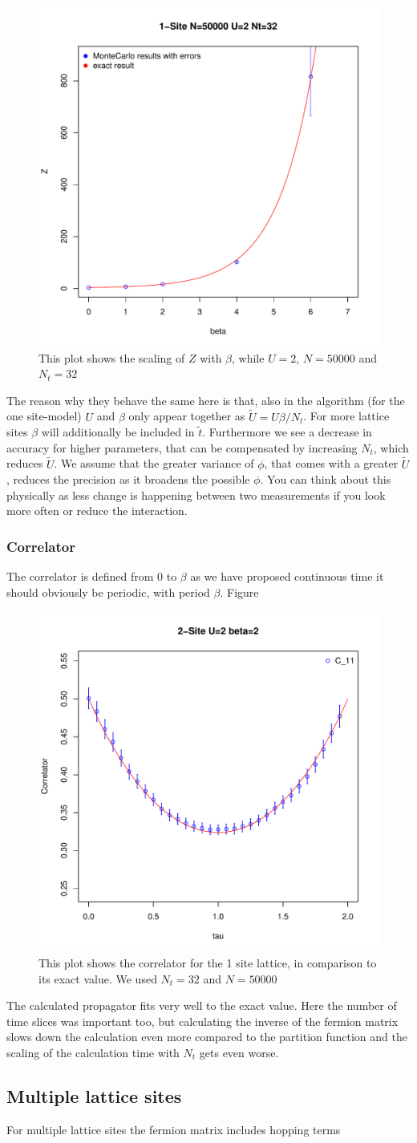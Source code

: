 \begin{figure}[H]
	\centering
	\includegraphics[width=0.5\linewidth]{figs/plot_Z1b}
	\caption[Scaling of Z with beta]{This plot shows the scaling of $Z$ with $\beta$, while $U=2$, $N=50000$ and $N_t=32$}
	\label{fig:plotz1b}
\end{figure}
The reason why they behave the same here is that, also in the algorithm (for the one site-model) $U$ and $\beta$ only appear together as $\tilde{U}=U\beta/N_t$. For more lattice sites $\beta$ will additionally be included in $\tilde{t}$.
Furthermore we see a decrease in accuracy for higher parameters, that can be compensated by increasing $N_t$, which reduces $\tilde{U}$. We assume that the greater variance of $\phi$, that comes with a greater $\tilde{U}$, reduces the precision as it broadens the possible $\phi$.
You can think about this physically as less change is happening between two measurements if you look more often or reduce the interaction.
\subsubsection{Correlator}
The correlator is defined from $0$ to $\beta$ as we have proposed continuous time it should obviously be periodic, with period $\beta$.
Figure 
\begin{figure}[H]
	\centering
	\includegraphics[width=0.5\linewidth]{figs/plot_C1t}
	\caption[Correlator 1 site]{This plot shows the correlator for the 1 site lattice, in comparison to its exact value. We used $N_t=32$ and $N=50000$}
	\label{fig:plotc1t}
\end{figure}
The calculated propagator fits very well to the exact value. Here the number of time slices was important too, but calculating the inverse of the fermion matrix slows down the calculation even more compared to the partition function and the scaling of the calculation time with $N_t$ gets even worse.
\subsection{Multiple lattice sites}
For multiple lattice sites the fermion matrix includes hopping terms